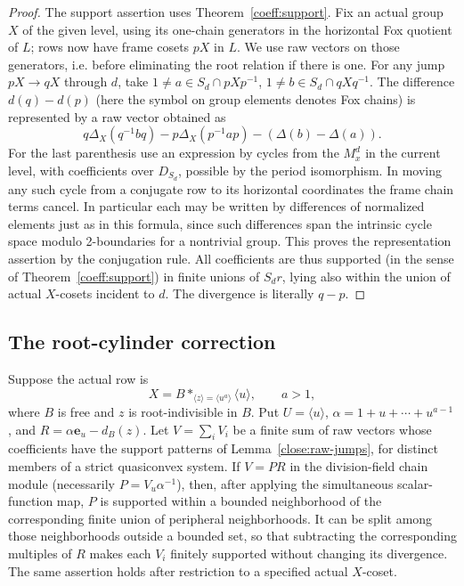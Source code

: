\begin{proof}
The support assertion uses Theorem~\ref{coeff:support}. Fix an actual group \(X\) of the given level, using its one-chain generators in the horizontal Fox quotient of \(L\); rows now have frame cosets \(pX\) in \(L\). We use raw vectors on those generators, i.e. before eliminating the root relation if there is one. For any jump \(pX\to qX\) through \(d\), take \(1\ne a\in S_d\cap pXp^{-1}\), \(1\ne b\in S_d\cap qXq^{-1}\). The difference \(d(q)-d(p)\) (here the symbol on group elements denotes Fox chains) is represented by a raw vector obtained as
\[
 q\Delta_X(q^{-1}bq)-p\Delta_X(p^{-1}ap) -
       (\Delta(b)-\Delta(a)).
\]
For the last parenthesis use an expression by cycles from the \(M_x^d\) in the current level, with coefficients over \(D_{S_d}\), possible by the period isomorphism. In moving any such cycle from a conjugate row to its horizontal coordinates the frame chain terms cancel. In particular each may be written by differences of normalized elements just as in this formula, since such differences span the intrinsic cycle space modulo 2-boundaries for a nontrivial group. This proves the representation assertion by the conjugation rule. All coefficients are thus supported (in the sense of Theorem~\ref{coeff:support}) in finite unions of \(S_d r\), lying also within the union of actual \(X\)-cosets incident to \(d\). The divergence is literally \(q-p\).
\end{proof}

\subsection{The root-cylinder correction}

\begin{lemma}\label{close:root-cylinder}
Suppose the actual row is
\[
 X=B*_{\langle z\rangle=\langle u^a\rangle}\langle u\rangle,
 \qquad a>1,
\]
where $B$ is free and $z$ is root-indivisible in $B$. Put
$U=\langle u\rangle$, $\alpha=1+u+\cdots+u^{a-1}$, and
$R=\alpha\mathbf e_u-d_B(z)$. Let $V=\sum_iV_i$ be a finite sum of raw
vectors whose coefficients have the support patterns of
Lemma~\ref{close:raw-jumps}, for distinct members of a strict
quasiconvex system. If $V=PR$ in the division-field chain module
(necessarily $P=V_u\alpha^{-1}$), then, after applying the simultaneous
scalar-function map, $P$ is supported within a bounded neighborhood
of the corresponding finite union of peripheral neighborhoods.
It can be split among those neighborhoods outside a bounded set, so
that subtracting the corresponding multiples of $R$ makes each $V_i$
finitely supported without changing its divergence. The same
assertion holds after restriction to a specified actual $X$-coset.
\end{lemma}

